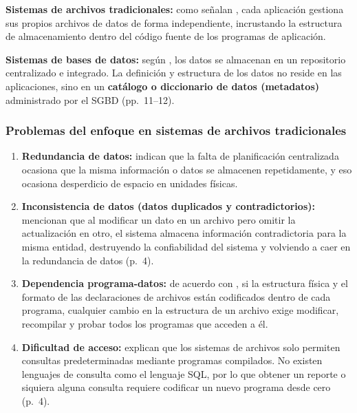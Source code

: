\textbf{Sistemas de archivos tradicionales:} como señalan \textcites[p.~10]{elmasri_navathe}[p.~3]{silberschatz_dbconcepts}, cada aplicación gestiona sus propios archivos de datos de forma independiente, incrustando la estructura de almacenamiento dentro del código fuente de los programas de aplicación.

\textbf{Sistemas de bases de datos:} según \textcite{elmasri_navathe}, los datos se almacenan en un repositorio centralizado e integrado. La definición y estructura de los datos no reside en las aplicaciones, sino en un \textbf{catálogo o diccionario de datos (metadatos)} administrado por el SGBD (pp.~11--12).

\subsubsection{Problemas del enfoque en sistemas de archivos tradicionales}

\begin{enumerate}[label=\arabic*.]
    \item \textbf{Redundancia de datos:} \textcites[p.~17]{elmasri_navathe}[p.~4]{silberschatz_dbconcepts} indican que la falta de planificación centralizada ocasiona que la misma información o datos se almacenen repetidamente, y eso ocasiona desperdicio de espacio en unidades físicas.
    \item \textbf{Inconsistencia de datos (datos duplicados y contradictorios):} \textcite{silberschatz_dbconcepts} mencionan que al modificar un dato en un archivo pero omitir la actualización en otro, el sistema almacena información contradictoria para la misma entidad, destruyendo la confiabilidad del sistema y volviendo a caer en la redundancia de datos (p.~4).
    \item \textbf{Dependencia programa-datos:} de acuerdo con \textcites[p.~11]{elmasri_navathe}[p.~4]{silberschatz_dbconcepts}, si la estructura física y el formato de las declaraciones de archivos están codificados dentro de cada programa, cualquier cambio en la estructura de un archivo exige modificar, recompilar y probar todos los programas que acceden a él.
    \item \textbf{Dificultad de acceso:} \textcite{silberschatz_dbconcepts} explican que los sistemas de archivos solo permiten consultas predeterminadas mediante programas compilados. No existen lenguajes de consulta como el lenguaje SQL, por lo que obtener un reporte o siquiera alguna consulta requiere codificar un nuevo programa desde cero (p.~4).
\end{enumerate}

